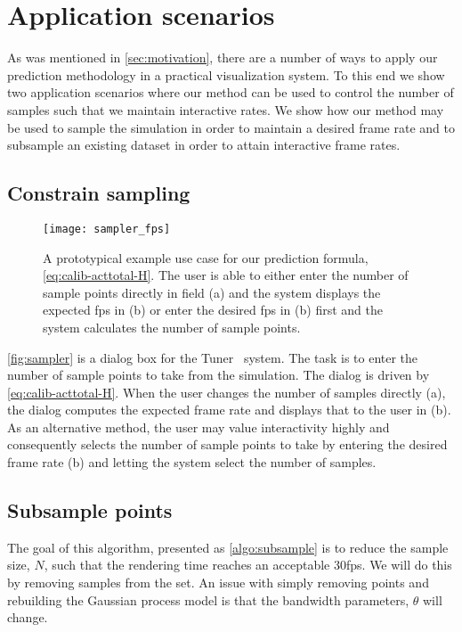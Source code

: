 \section{Application scenarios}
\label{sec:application_scenarios}

As was mentioned in \autoref{sec:motivation}, there are a number of ways to apply
our prediction methodology in a practical visualization system. 
To this end we show two application scenarios where our method can be
used to control the number of samples such that we maintain interactive 
rates.  We show how our method may be used 
to sample the simulation in order
to maintain a desired frame rate and to subsample an existing dataset in
order to attain interactive frame rates.

\subsection{Constrain sampling}
\label{sec:constrainsampling}

\begin{figure}[h]
\centering
\texttt{[image: sampler\_fps]}
\caption{A prototypical example use case for our prediction formula,
 \autoref{eq:calib-acttotal-H}. The user
 is able to either enter the number of sample points directly in field (a)
 and the system displays the expected fps in (b) or enter the desired fps
 in (b) first and the system calculates the number of sample points.
}
\label{fig:sampler}
\end{figure}


\autoref{fig:sampler} is a dialog box for the Tuner~\cite{Torsney-Weir:2011} system. 
The task is
to enter the number of sample points to take from the simulation. The dialog
is driven by \autoref{eq:calib-acttotal-H}. When the user changes the number of
samples directly (a), the dialog computes the expected frame rate and displays
that to the user in (b). As an alternative method, the user may value
interactivity highly and consequently selects the number of sample points to
take by entering the desired frame rate (b) and letting the system select the
number of samples.

\subsection{Subsample points}
\label{sec:subsamplepoints}

The goal of this algorithm, presented as \autoref{algo:subsample} is to reduce the
sample size, $N$, such that the rendering time reaches an acceptable 30fps.
We will do this by removing samples from the set.  An issue with simply
removing points and rebuilding the Gaussian process model is that the
bandwidth parameters, $\theta$ will change.

